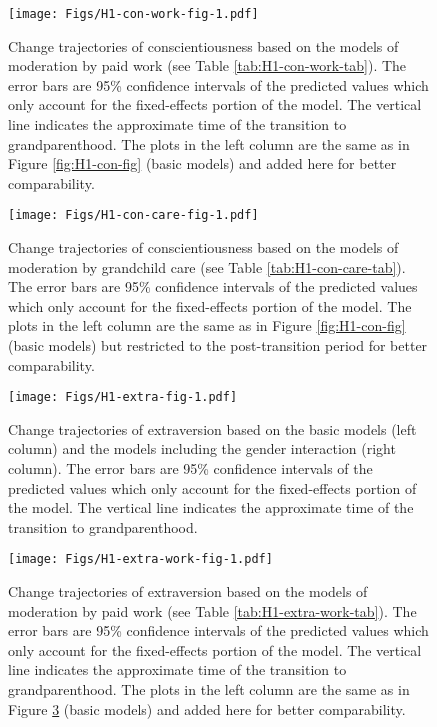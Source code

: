 \documentclass[
  english,
  man, noextraspace]{apa7}
\begin{document}
\begin{appendix}
\begin{figure}
\centering
\texttt{[image: Figs/H1-con-work-fig-1.pdf]}
\caption{\label{fig:H1-con-work-fig}Change trajectories of conscientiousness based
on the models of moderation by paid work (see Table
\ref{tab:H1-con-work-tab}). The error bars are 95\% confidence intervals
of the predicted values which only account for the fixed-effects portion
of the model. The vertical line indicates the approximate time of the
transition to grandparenthood. The plots in the left column are the same
as in Figure \ref{fig:H1-con-fig} (basic models) and added here for
better comparability.}
\end{figure}









\begin{figure}
\centering
\texttt{[image: Figs/H1-con-care-fig-1.pdf]}
\caption{\label{fig:H1-con-care-fig}Change trajectories of conscientiousness based
on the models of moderation by grandchild care (see Table
\ref{tab:H1-con-care-tab}). The error bars are 95\% confidence intervals
of the predicted values which only account for the fixed-effects portion
of the model. The plots in the left column are the same as in Figure
\ref{fig:H1-con-fig} (basic models) but restricted to the
post-transition period for better comparability.}
\end{figure}








\begin{figure}
\centering
\texttt{[image: Figs/H1-extra-fig-1.pdf]}
\caption{\label{fig:H1-extra-fig}Change trajectories of extraversion based on the
basic models (left column) and the models including the gender
interaction (right column). The error bars are 95\% confidence intervals
of the predicted values which only account for the fixed-effects portion
of the model. The vertical line indicates the approximate time of the
transition to grandparenthood.}
\end{figure}










\begin{figure}
\centering
\texttt{[image: Figs/H1-extra-work-fig-1.pdf]}
\caption{\label{fig:H1-extra-work-fig}Change trajectories of extraversion based on
the models of moderation by paid work (see Table
\ref{tab:H1-extra-work-tab}). The error bars are 95\% confidence
intervals of the predicted values which only account for the
fixed-effects portion of the model. The vertical line indicates the
approximate time of the transition to grandparenthood. The plots in the
left column are the same as in Figure \ref{fig:H1-extra-fig} (basic
models) and added here for better comparability.}
\end{figure}










\end{appendix}
\end{document}
